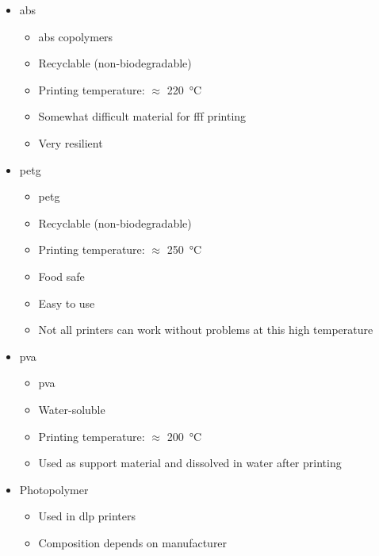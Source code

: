 \documentclass[aspectratio=169]{beamer}
\begin{document}
\begin{frame}
    \begin{itemize}
        \item \acs{abs}
              \begin{itemize}
                  \item \acl{abs} copolymers
                  \item Recyclable (non-biodegradable)
                  \item Printing temperature: $\approx$ \SI{220}{\celsius}
                  \item Somewhat difficult material for \acs{fff} printing
                  \item Very resilient
              \end{itemize}
        \item \acs{petg}
              \begin{itemize}
                  \item \acl{petg}
                  \item Recyclable (non-biodegradable)
                  \item Printing temperature: $\approx$ \SI{250}{\celsius}
                  \item Food safe
                  \item Easy to use
                  \item Not all printers can work without problems at this high temperature
              \end{itemize}
    \end{itemize}
\end{frame}

\begin{frame}
    \begin{itemize}
        \item \acs{pva}
              \begin{itemize}
                  \item \acl{pva}
                  \item Water-soluble
                  \item Printing temperature: $\approx$ \SI{200}{\celsius}
                  \item Used as support material and dissolved in water after printing
              \end{itemize}
        \item Photopolymer
              \begin{itemize}
                  \item Used in \acs{dlp} printers
                  \item Composition depends on manufacturer
              \end{itemize}
    \end{itemize}
\end{frame}
\end{document}
